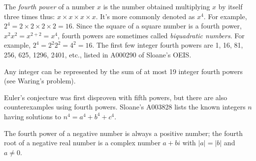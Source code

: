 \documentclass[12pt]{article}
\begin{document}
The {\em fourth power} of a number $x$ is the number obtained multiplying $x$ by itself three times thus: $x \times x \times x \times x$. It's more commonly denoted as $x^4$. For example, $2^4 = 2 \times 2 \times 2 \times 2 = 16$. Since the square of a square number is a fourth power, $x^2 x^2 = x^{2 + 2} = x^4$, fourth powers are sometimes called {\em biquadratic numbers}. For example, $2^4 = 2^2 2^2 = 4^2 = 16$. The first few integer fourth powers are 1, 16, 81, 256, 625, 1296, 2401, etc., listed in A000290 of Sloane's OEIS.

Any integer can be represented by the sum of at most 19 integer fourth powers (see Waring's problem).

Euler's conjecture was first disproven with fifth powers, but there are also counterexamples using fourth powers. Sloane's A003828 lists the known integers $n$ having solutions to $n^4 = a^4 + b^4 + c^4$.

The fourth power of a negative number is always a positive number; the fourth root of a negative real number is a complex number $a + bi$ with $|a| = |b|$ and $a \neq 0$.
\end{document}

